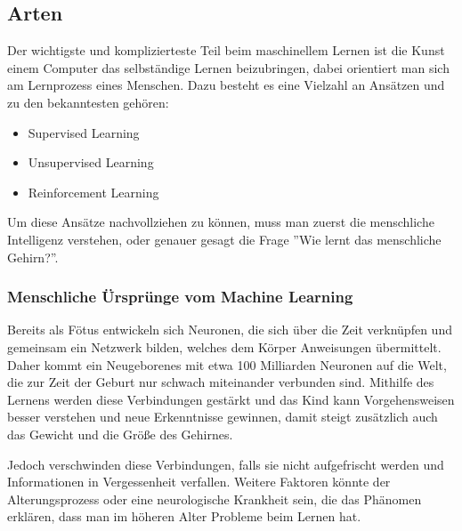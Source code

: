 \subsection{Arten}

Der wichtigste und komplizierteste Teil beim maschinellem Lernen ist die Kunst einem Computer das selbständige Lernen beizubringen, dabei orientiert man sich am Lernprozess eines Menschen. Dazu besteht es eine Vielzahl an Ansätzen und zu den bekanntesten gehören:

\begin{itemize}
    \item Supervised Learning
    \item Unsupervised Learning
    \item Reinforcement Learning
\end{itemize}

Um diese Ansätze nachvollziehen zu können, muss man zuerst die menschliche Intelligenz verstehen, oder genauer gesagt die Frage ''Wie lernt das menschliche Gehirn?''.

\subsubsection{Menschliche Ürsprünge vom Machine Learning}

Bereits als Fötus entwickeln sich Neuronen, die sich über die Zeit verknüpfen und gemeinsam ein Netzwerk bilden, welches dem Körper Anweisungen übermittelt. Daher kommt ein Neugeborenes mit etwa 100 Milliarden Neuronen auf die Welt, die zur Zeit der Geburt nur schwach miteinander verbunden sind. Mithilfe des Lernens werden diese Verbindungen gestärkt und das Kind kann Vorgehensweisen besser verstehen und neue Erkenntnisse gewinnen, damit steigt zusätzlich auch das Gewicht und die Größe des Gehirnes. \cite{LANP}

Jedoch verschwinden diese Verbindungen, falls sie nicht aufgefrischt werden und Informationen in Vergessenheit verfallen. Weitere Faktoren könnte der Alterungsprozess oder eine neurologische Krankheit sein, die das Phänomen erklären, dass man im höheren Alter Probleme beim Lernen hat. \cite{GENTW}

